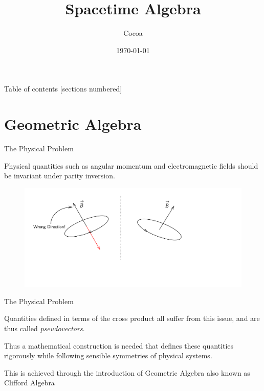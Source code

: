 \documentclass{beamer}
\title {Spacetime Algebra}
\author {Cocoa}
\date{\today}
\institute{Ashoka University}
\begin{document}
\maketitle
	
\begin{frame}{Table of contents}
	[sections numbered]
	\tableofcontents[hideallsubsections]
\end{frame}

\section{Geometric Algebra}

\begin{frame}{The Physical Problem}

Physical quantities such as angular momentum and electromagnetic fields should be invariant under parity inversion. 
\pause

\begin{figure}
	\centering
	\includegraphics[scale=0.14]{Figures/BField.png}
\end{figure}
\end{frame}

\begin{frame}{The Physical Problem}

Quantities defined in terms of the cross product all suffer from this issue, and are thus called \emph{pseudovectors}.
\pause

Thus a mathematical construction is needed that defines these quantities rigorously while following sensible symmetries of physical systems.
\pause

This is achieved through the introduction of \alert{Geometric Algebra} also known as Clifford Algebra 
	
\end{frame}
\end{document}
